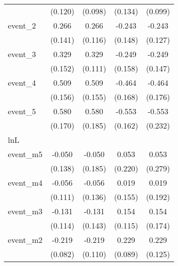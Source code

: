 {\begin{tabular}{l*{4}{c}}
            &     (0.120)         &     (0.098)         &     (0.134)         &     (0.099)         \\
[1em]
event\_2     &       0.266         &       0.266\sym{*}  &      -0.243         &      -0.243         \\
            &     (0.141)         &     (0.116)         &     (0.148)         &     (0.127)         \\
[1em]
event\_3     &       0.329\sym{*}  &       0.329\sym{**} &      -0.249         &      -0.249         \\
            &     (0.152)         &     (0.111)         &     (0.158)         &     (0.147)         \\
[1em]
event\_4     &       0.509\sym{**} &       0.509\sym{**} &      -0.464\sym{**} &      -0.464\sym{**} \\
            &     (0.156)         &     (0.155)         &     (0.168)         &     (0.176)         \\
[1em]
event\_5     &       0.580\sym{***}&       0.580\sym{**} &      -0.553\sym{***}&      -0.553\sym{*}  \\
            &     (0.170)         &     (0.185)         &     (0.162)         &     (0.232)         \\
\hline
lnL         &                     &                     &                     &                     \\
event\_m5    &      -0.050         &      -0.050         &       0.053         &       0.053         \\
            &     (0.138)         &     (0.185)         &     (0.220)         &     (0.279)         \\
[1em]
event\_m4    &      -0.056         &      -0.056         &       0.019         &       0.019         \\
            &     (0.111)         &     (0.136)         &     (0.155)         &     (0.192)         \\
[1em]
event\_m3    &      -0.131         &      -0.131         &       0.154         &       0.154         \\
            &     (0.114)         &     (0.143)         &     (0.115)         &     (0.174)         \\
[1em]
event\_m2    &      -0.219\sym{**} &      -0.219\sym{*}  &       0.229\sym{*}  &       0.229         \\
            &     (0.082)         &     (0.110)         &     (0.089)         &     (0.125)         \\

\end{tabular}}
